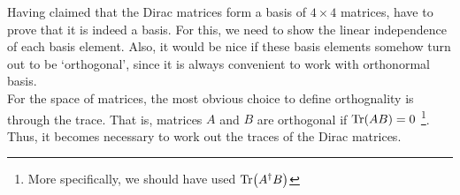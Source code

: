 Having claimed that the Dirac matrices form a basis of $4\times 4$ matrices, have to prove that it is indeed a basis. For this, we need to show the linear independence of each basis element. Also, it would be nice if these basis elements somehow turn out to be `orthogonal', since it is always convenient to work with orthonormal basis.\\[0.2cm]
For the space of matrices, the most obvious choice to define orthognality is through the trace. That is, matrices $A$ and $B$ are orthogonal if $\Tr(AB) = 0$ \footnote{More specifically, we should have used $\Tr(A^\dagger B)$}. Thus, it becomes necessary to work out the traces of the Dirac matrices.
